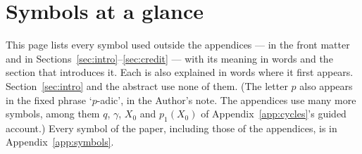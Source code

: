 \documentclass[11pt]{article}
\theoremstyle{remark}
\begin{document}

\section*{Symbols at a glance}

This page lists every symbol used outside the appendices --- in the front matter and in Sections~\ref{sec:intro}--\ref{sec:credit} --- with its meaning in words and the section that introduces it. Each is also explained in words where it first appears. Section~\ref{sec:intro} and the abstract use none of them. (The letter $p$ also appears in the fixed phrase `$p$-adic', in the Author's note. The appendices use many more symbols, among them $q$, $\gamma$, $X_0$ and $p_1(X_0)$ of Appendix~\ref{app:cycles}'s guided account.) Every symbol of the paper, including those of the appendices, is in Appendix~\ref{app:symbols}.
\end{document}

